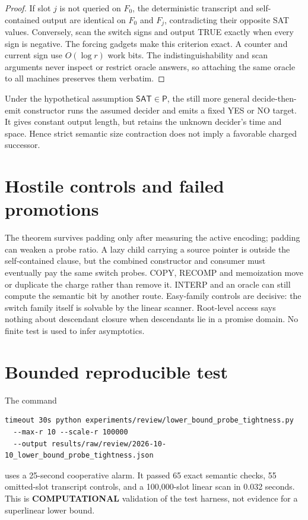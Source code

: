 \documentclass[11pt]{article}
\newcommand{\SAT}{\mathsf{SAT}}
\begin{document}
\begin{proof}
If slot $j$ is not queried on $F_0$, the deterministic transcript and
self-contained output are identical on $F_0$ and $F_j$, contradicting
their opposite SAT values. Conversely, scan the switch signs and output
TRUE exactly when every sign is negative. The forcing gadgets make this
criterion exact. A counter and current sign use $O(\log r)$ work bits.
The indistinguishability and scan arguments never inspect or restrict
oracle answers, so attaching the same oracle to all machines preserves
them verbatim.
\end{proof}

Under the hypothetical assumption $\SAT\in\mathsf P$, the still more
general decide-then-emit constructor runs the assumed decider and emits a
fixed YES or NO target. It gives constant output length, but retains the
unknown decider's time and space. Hence strict semantic size contraction
does not imply a favorable charged successor.

\section{Hostile controls and failed promotions}
The theorem survives padding only after measuring the active encoding;
padding can weaken a probe ratio. A lazy child carrying a source pointer
is outside the self-contained clause, but the combined constructor and
consumer must eventually pay the same switch probes. COPY, RECOMP and
memoization move or duplicate the charge rather than remove it.
INTERP and an oracle can still compute the semantic bit by another route.
Easy-family controls are decisive: the switch family itself is solvable by
the linear scanner. Root-level access says nothing about descendant
closure when descendants lie in a promise domain. No finite test is used
to infer asymptotics.

\section{Bounded reproducible test}
The command
\begin{verbatim}
timeout 30s python experiments/review/lower_bound_probe_tightness.py
  --max-r 10 --scale-r 100000
  --output results/raw/review/2026-10-10_lower_bound_probe_tightness.json
\end{verbatim}
uses a 25-second cooperative alarm. It passed 65 exact semantic checks,
55 omitted-slot transcript controls, and a 100,000-slot linear scan in
0.032 seconds. This is \textbf{COMPUTATIONAL} validation of the test
harness, not evidence for a superlinear lower bound.
\end{document}
